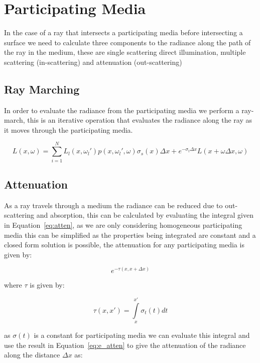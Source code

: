 \section{Participating Media}
In the case of a ray that intersects a participating media before intersecting a surface we need to calculate three components to
the radiance along the path of the ray in the medium, these are single scattering direct illumination, multiple scattering (in-scattering)
and attenuation (out-scattering)

\subsection{Ray Marching}
In order to evaluate the radiance from the participating media we perform a ray-march, this is an iterative operation that evaluates the
radiance along the ray as it moves through the participating media.

\begin{equation}
L(x, \omega) = \sum\limits_{i = 1}^N L_l(x, \omega_l')p(x, \omega_l', \omega)\sigma_s(x)\Delta x + e^{- \sigma_t \Delta x} L (x + \omega \Delta x, \omega)
\end{equation}

\subsection{Attenuation}
As a ray travels through a medium the radiance can be reduced due to out-scattering and absorption, this can be calculated by evaluating
the integral given in Equation~\eqref{eq:atten}, as we are only considering homogeneous participating media this can be
simplified as the properties being integrated are constant and a closed form solution is possible, the attenuation for any participating media
is given by:

\begin{equation}
	e^{-\tau(x, x + \Delta x)}
\label{eq:e_atten}
\end{equation}

where $\tau$ is given by:

\begin{equation}
	\tau(x, x') = \int\limits_x^{x'} \sigma_t(t) dt
\label{eq:atten}
\end{equation}

as $\sigma(t)$ is a constant for participating media we can evaluate this
integral and use the result in Equation~\eqref{eq:e_atten}
to give the attenuation of the radiance along the distance $\Delta x$ as:

